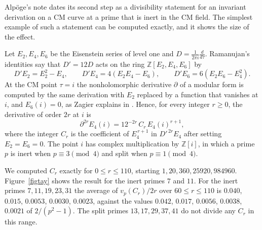 \documentclass[11pt,letterpaper]{article}
\numberwithin{equation}{section}
\begin{document}
Alp\"oge's note dates its second step as a divisibility statement for an invariant derivation on a CM curve at a prime that is inert in the CM field. The simplest example of such a statement can be computed exactly, and it shows the size of the effect.

Let $E_2,E_4,E_6$ be the Eisenstein series of level one and $D=\frac1{2\pi i}\frac d{d\tau}$. Ramanujan's identities say that $D'=12D$ acts on the ring $\mathbb Z[E_2,E_4,E_6]$ by
\[
D'E_2=E_2^2-E_4,\qquad D'E_4=4(E_2E_4-E_6),\qquad D'E_6=6(E_2E_6-E_4^2).
\]
At the CM point $\tau=i$ the nonholomorphic derivative $\partial$ of a modular form is computed by the same derivation with $E_2$ replaced by a function that vanishes at $i$, and $E_6(i)=0$, as Zagier explains in \cite[\S5]{zagier}. Hence, for every integer $r\ge0$, the derivative of order $2r$ at $i$ is
\[
\partial^{2r}E_4(i)=12^{-2r}\,C_r\,E_4(i)^{r+1},
\]
where the integer $C_r$ is the coefficient of $E_4^{\,r+1}$ in $D'^{\,2r}E_4$ after setting $E_2=E_6=0$. The point $i$ has complex multiplication by $\mathbb Z[i]$, in which a prime $p$ is inert when $p\equiv3\pmod4$ and split when $p\equiv1\pmod4$.

We computed $C_r$ exactly for $0\le r\le110$, starting $1,20,360,25920,984960$. Figure~\ref{figtay} shows the result for the inert primes $7$ and $11$. For the inert primes $7,11,19,23,31$ the average of $v_p(C_r)/2r$ over $60\le r\le110$ is $0.040$, $0.015$, $0.0053$, $0.0030$, $0.0023$, against the values $0.042$, $0.017$, $0.0056$, $0.0038$, $0.0021$ of $2/(p^2-1)$. The split primes $13,17,29,37,41$ do not divide any $C_r$ in this range.
\end{document}
